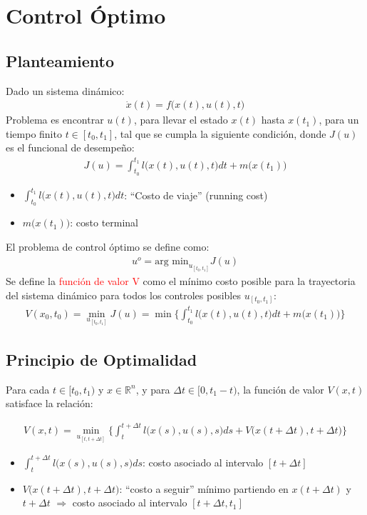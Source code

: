 \chapter{Control Óptimo}


\section{Planteamiento}
Dado un sistema dinámico:
\begin{align*}
    \dot{x}(t)=f\big( x(t),u(t),t\big) 
\end{align*}
Problema es encontrar $u(t)$, para llevar el estado $x(t)$ hasta $x(t_1)$, para un tiempo finito $t\in[t_0,t_1]$, tal que se cumpla la siguiente condición, donde $J(u)$ es el funcional de desempeño:
\begin{align*}
    J(u)=\int_{t_0}^{t_1}l\big(x(t),u(t),t\big)dt+m\big(x(t_1)\big)
\end{align*}

\begin{itemize}
    \item $\int_{t_0}^{t_1}l\big(x(t),u(t),t\big)dt$: ``Costo de viaje'' (running cost)
    \item $m\big(x(t_1)\big)$: costo terminal
\end{itemize}
El problema de control óptimo se define como:
\begin{align*}
    u^o=\text{arg min}_{u_{[t_0,t_1]}}J(u)
\end{align*}
Se define la \textcolor{red}{función de valor V} como el mínimo costo posible para la trayectoria del sistema dinámico para todos los controles posibles $u_{[t_0,t_1]}$:
\begin{align*}
    V(x_0,t_0) = \min_{u_{[t_0,t_1]}}J(u) = \min\Big\{\int_{t_0}^{t_1}l\big(x(t),u(t),t\big)dt+m\big(x(t_1)\big)  \Big\}
\end{align*}

\section{Principio de Optimalidad}
Para cada $t\in[t_0,t_1)$ y $x\in\mathbb{R}^n$, y para $\Delta t\in[0,t_1-t)$, la función de valor $V(x,t)$ satisface la relación: 

\begin{align*}
    V(x,t) = \min_{u_{[t,t+\Delta t]}} \Big\{ \int_t^{t+\Delta t} l\big(x(s),u(s),s\big)ds+V\big(x(t+\Delta t),t+\Delta t\big)\Big\}
\end{align*}
\begin{itemize}
    \item $\int_t^{t+\Delta t} l\big(x(s),u(s),s\big)ds$: costo asociado al intervalo $[t+\Delta t]$
    \item $V\big(x(t+\Delta t),t+\Delta t\big)$: ``costo a seguir'' mínimo partiendo en $x(t+\Delta t)$ y $t+\Delta t$ $\Longrightarrow$ costo asociado al intervalo $[t+\Delta t,t_1]$
\end{itemize}

